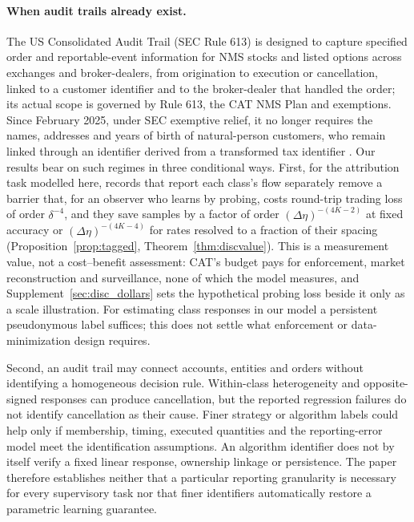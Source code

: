 \documentclass[12pt]{article}
\theoremstyle{definition}
\theoremstyle{remark}
\begin{document}
\paragraph{When audit trails already exist.} The US Consolidated Audit Trail (SEC Rule 613) is designed to capture specified order and reportable-event information for NMS stocks and listed options across exchanges and broker-dealers, from origination to execution or cancellation, linked to a customer identifier and to the broker-dealer that handled the order; its actual scope is governed by Rule 613, the CAT NMS Plan and exemptions. Since February 2025, under SEC exemptive relief, it no longer requires the names, addresses and years of birth of natural-person customers, who remain linked through an identifier derived from a transformed tax identifier \citep{sec2012,sec2016,sec2024cat,sec2025}. Our results bear on such regimes in three conditional ways. First, for the attribution task modelled here, records that report each class's flow separately remove a barrier that, for an observer who learns by probing, costs round-trip trading loss of order $\delta^{-4}$, and they save samples by a factor of order $(\Delta\eta)^{-(4K-2)}$ at fixed accuracy or $(\Delta\eta)^{-(4K-4)}$ for rates resolved to a fraction of their spacing (Proposition~\ref{prop:tagged}, Theorem~\ref{thm:discvalue}). This is a measurement value, not a cost--benefit assessment: CAT's budget pays for enforcement, market reconstruction and surveillance, none of which the model measures, and Supplement~\ref{sec:disc_dollars} sets the hypothetical probing loss beside it only as a scale illustration. For estimating class responses in our model a persistent pseudonymous label suffices; this does not settle what enforcement or data-minimization design requires. 

Second, an audit trail may connect accounts, entities and orders without identifying a homogeneous decision rule. Within-class heterogeneity and opposite-signed responses can produce cancellation, but the reported regression failures do not identify cancellation as their cause. Finer strategy or algorithm labels could help only if membership, timing, executed quantities and the reporting-error model meet the identification assumptions. An algorithm identifier does not by itself verify a fixed linear response, ownership linkage or persistence. The paper therefore establishes neither that a particular reporting granularity is necessary for every supervisory task nor that finer identifiers automatically restore a parametric learning guarantee.
\end{document}
